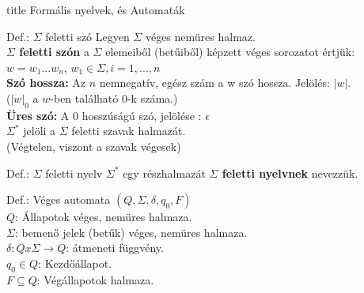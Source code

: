 \documentclass{beamer}
\begin{document}

\begin{frame}[plain]
\begin{beamercolorbox}[center]{title}
    {\Huge Formális nyelvek, és Automaták}
\end{beamercolorbox}
\end{frame}


\begin{frame}
\begin{block}{Def.: $\Sigma$ feletti szó}
Legyen $\Sigma$ véges nemüres halmaz.\\
\medskip
\textbf{$\Sigma$ feletti szón} a $\Sigma$ elemeiből (betűiből) képzett véges sorozatot értjük: \\
\medskip
$w = w_1 ... w_n$, $w_1 \in {\Sigma}, i = 1, ..., n$\\
\medskip
\textbf{Szó hossza:} Az $n$ nemnegatív, egész szám a w szó hossza. Jelölés: $|w|$.\\
($|w|_0$ a $w$-ben található $0$-k száma.)\\
\medskip
\textbf{Üres szó:} A $0$ hosszúságú szó, jelölése : $\epsilon$\\
\medskip
${\Sigma}^*$ jelöli a $\Sigma$ feletti szavak halmazát.\\
(Végtelen, viszont a szavak végesek)
\end{block}

\begin{block}{Def.: $\Sigma$ feletti nyelv}
${\Sigma}^*$ egy részhalmazát \textbf{$\Sigma$ feletti nyelvnek} nevezzük.
\end{block}

\begin{block}{Def.: Véges automata}
\textbf{$(Q, {\Sigma}, {\delta}, q_0, F)$}\\
\medskip
$Q$: Állapotok véges, nemüres halmaza.\\
\medskip
$\Sigma$: bemenő jelek (betűk) véges, nemüres halmaza.\\
\medskip
$\delta : Q x \Sigma \rightarrow Q$: átmeneti függvény.\\
\medskip
$q_0 \in Q$: Kezdőállapot.\\
\medskip
$F \subseteq Q$: Végállapotok halmaza.\\
\end{block}

\end{frame}
\end{document}
